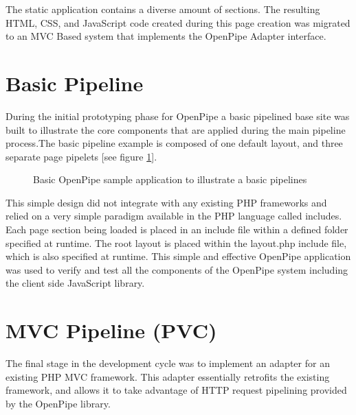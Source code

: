 \documentclass[12pt]{report}
\begin{document}
The static application contains a diverse amount of sections. The resulting HTML, CSS, and JavaScript code created during this page creation was migrated to an MVC Based system that implements the OpenPipe Adapter interface.


\section{Basic Pipeline}
During the initial prototyping phase for OpenPipe a basic pipelined base site was built to illustrate the core components that are applied during the main pipeline process.The basic pipeline example is composed of one default layout, and three separate page pipelets [see figure \ref{fig:basicPipeline}]. 

\begin{figure}[H]
\label{fig:basicPipeline}
\centering
{}
\caption{Basic OpenPipe sample application to illustrate a basic pipelines}
\end{figure}

This simple design did not integrate with any existing PHP frameworks and relied on a very simple paradigm available in the PHP language called includes. Each page section being loaded is placed in an include file within a defined folder specified at runtime. The root layout is placed within the layout.php include file, which is also specified at runtime. This simple and effective OpenPipe application was used to verify and test all the components of the OpenPipe system including the client side JavaScript library. 


\section{MVC Pipeline (PVC)}
The final stage in the development cycle was to implement an adapter for an existing PHP MVC framework. This adapter essentially retrofits the existing framework, and allows it to take advantage of HTTP request pipelining provided by the OpenPipe library. 
\end{document}
